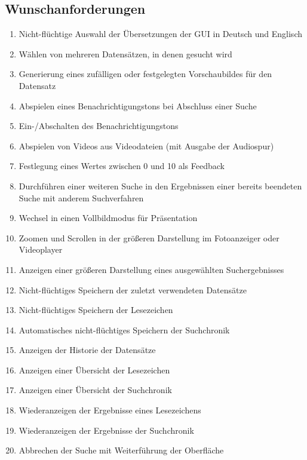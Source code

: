 \subsection{Wunschanforderungen}
\begin{enumerate} [label=\bfseries /FW \arabic*0/, leftmargin=*]
	\item Nicht-flüchtige Auswahl der Übersetzungen der GUI in Deutsch und Englisch \chk
	\newline
	\item Wählen von mehreren Datensätzen, in denen gesucht wird \chk
	\item Generierung eines zufälligen oder festgelegten Vorschaubildes für den Datensatz \chk
	\newline
	\item Abspielen eines Benachrichtigungstons bei Abschluss einer Suche \chk
	\item Ein-/Abschalten des Benachrichtigungstons \chk
	\item Abspielen von Videos aus Videodateien (mit Ausgabe der Audiospur)\nochk
	\newline
	\item Festlegung eines Wertes zwischen 0 und 10 als Feedback\nochk
	\item Durchführen einer weiteren Suche in den Ergebnissen einer bereits beendeten Suche mit anderem Suchverfahren\nochk
	\newline
	\item Wechsel in einen Vollbildmodus für Präsentation \chk
	\item Zoomen und Scrollen in der größeren Darstellung im Fotoanzeiger oder Videoplayer \chk
	\item Anzeigen einer größeren Darstellung eines ausgewählten Suchergebnisses\nochk
	\newline
	\item Nicht-flüchtiges Speichern der zuletzt verwendeten Datensätze \chk
	\item Nicht-flüchtiges Speichern der Lesezeichen\nochk
	\item Automatisches nicht-flüchtiges Speichern der Suchchronik\nochk
	\item Anzeigen der Historie der Datensätze \chk
	\item Anzeigen einer Übersicht der Lesezeichen\nochk
	\item Anzeigen einer Übersicht der Suchchronik\nochk
	\item Wiederanzeigen der Ergebnisse eines Lesezeichens\nochk
	\item Wiederanzeigen der Ergebnisse der Suchchronik\nochk
	\newline
	\item Abbrechen der Suche mit Weiterführung der Oberfläche\nochk
\end{enumerate}
\pagebreak
